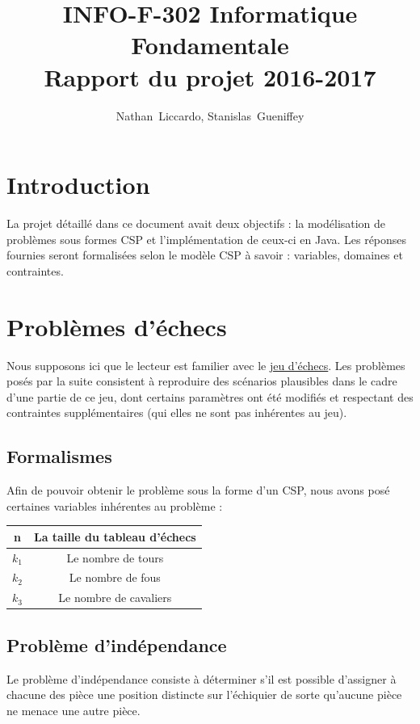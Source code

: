\documentclass[a4paper]{article}
\title{INFO-F-302 Informatique Fondamentale \\ Rapport du projet 2016-2017}
\author{Nathan~Liccardo, Stanislas~Gueniffey}
\begin{document}
\maketitle

\section{Introduction}
La projet détaillé dans ce document avait deux objectifs : la modélisation de problèmes sous formes CSP et l'implémentation de ceux-ci en Java. Les réponses fournies seront formalisées selon le modèle CSP à savoir : variables, domaines et contraintes.

\section{Problèmes d'échecs}
Nous supposons ici que le lecteur est familier avec le \href{https://fr.wikipedia.org/wiki/%C3%89checs}{jeu d'échecs}. Les problèmes posés par la suite consistent à reproduire des scénarios plausibles dans le cadre d'une partie de ce jeu, dont certains paramètres ont été modifiés et respectant des contraintes supplémentaires (qui elles ne sont pas inhérentes au jeu).

\subsection{Formalismes}
Afin de pouvoir obtenir le problème sous la forme d'un CSP, nous avons posé certaines variables inhérentes au problème : 
\begin{center}
\begin{tabular}{|c|c|}
\hline
n & La taille du tableau d'échecs \\
\hline
$k_1$ & Le nombre de tours \\
\hline
$k_2$ & Le nombre de fous \\
\hline
$k_3$ & Le nombre de cavaliers  \\
\hline
\end{tabular}
\end{center}

\subsection{Problème d'indépendance}
Le problème d’indépendance consiste à déterminer s’il est possible d’assigner à chacune des pièce une position distincte sur l'échiquier de sorte qu’aucune pièce ne menace une autre pièce.\\ 
\begin{center}
\end{center}
\end{document}

